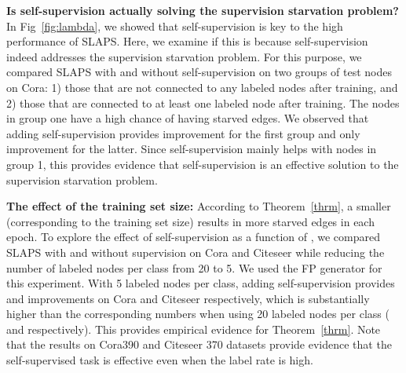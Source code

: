 \documentclass{article}
\begin{document}
\textbf{Is self-supervision actually solving the supervision starvation problem?} In Fig~\ref{fig:lambda}, we showed that self-supervision is key to the high performance of SLAPS. Here, we examine if this is because self-supervision indeed addresses the supervision starvation problem. For this purpose, we compared SLAPS with and without self-supervision on two groups of test nodes on Cora: 1) those that are not connected to any labeled nodes after training, and 2) those that are connected to at least one labeled node after training. The nodes in group one have a high chance of having starved edges. We observed that adding self-supervision provides  improvement for the first group and only  improvement for the latter. Since self-supervision mainly helps with nodes in group 1, this provides evidence that self-supervision is an effective solution to the supervision starvation problem.

\textbf{The effect of the training set size:} According to Theorem~\ref{thrm}, a smaller  (corresponding to the training set size) results in more starved edges in each epoch. To explore the effect of self-supervision as a function of , we compared SLAPS with and without supervision on Cora and Citeseer while reducing the number of labeled nodes per class from 20 to 5. We used the FP generator for this experiment. With 5 labeled nodes per class, adding self-supervision provides   and  improvements on Cora and Citeseer respectively, which is substantially higher than the corresponding numbers when using 20 labeled nodes per class ( and  respectively). 
This provides empirical evidence for Theorem~\ref{thrm}. Note that the results on Cora390 and Citeseer 370 datasets provide evidence that the self-supervised task is effective even when the label rate is high.
\end{document}
